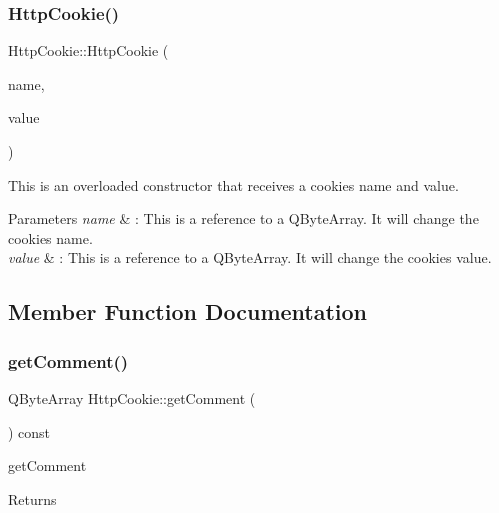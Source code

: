 \subsubsection{\texorpdfstring{Http\+Cookie()}{HttpCookie()}\hspace{0.1cm}{\footnotesize\ttfamily [3/3]}}
{\footnotesize\ttfamily Http\+Cookie\+::\+Http\+Cookie (\begin{DoxyParamCaption}\item[{const Q\+Byte\+Array \&}]{name,  }\item[{const Q\+Byte\+Array \&}]{value }\end{DoxyParamCaption})}



This is an overloaded constructor that receives a cookie\textquotesingle{}s name and value. 


\begin{DoxyParams}{Parameters}
{\em name} & \+: This is a reference to a Q\+Byte\+Array. It will change the cookie\textquotesingle{}s name. \\
\hline
{\em value} & \+: This is a reference to a Q\+Byte\+Array. It will change the cookie\textquotesingle{}s value. \\
\hline
\end{DoxyParams}


\subsection{Member Function Documentation}
\mbox{\label{class_http_cookie_ad48e447c1d4dfbed9e81713016ca0531}} 
\subsubsection{\texorpdfstring{get\+Comment()}{getComment()}}
{\footnotesize\ttfamily Q\+Byte\+Array Http\+Cookie\+::get\+Comment (\begin{DoxyParamCaption}{ }\end{DoxyParamCaption}) const}



get\+Comment 

\begin{DoxyReturn}{Returns}

\end{DoxyReturn}
\mbox{\label{class_http_cookie_aeaafc0d8651b07c94d1ed247a4e23dff}} 
